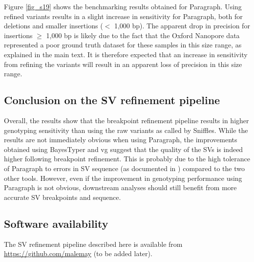 \documentclass[12pt]{article}
\begin{document}
Figure \ref{fig_s19} shows the benchmarking results obtained for Paragraph.
Using refined variants results in a slight increase in sensitivity for Paragraph, both for deletions and smaller insertions ($<$ 1,000 bp).
The apparent drop in precision for insertions $\geq$ 1,000 bp is likely due to the fact that the Oxford Nanopore data represented a poor ground truth dataset for these samples in this size range, as explained in the main text.
It is therefore expected that an increase in sensitivity from refining the variants will result in an apparent loss of precision in this size range.

\subsection{Conclusion on the SV refinement pipeline}

Overall, the results show that the breakpoint refinement pipeline results in higher genotyping sensitivity than using the raw variants as called by Sniffles.
While the results are not immediately obvious when using Paragraph, the improvements obtained using BayesTyper and vg suggest that the quality of the SVs is indeed higher following breakpoint refinement.
This is probably due to the high tolerance of Paragraph to errors in SV sequence (as documented in \cite{paragraph}) compared to the two other tools.
However, even if the improvement in genotyping performance using Paragraph is not obvious, downstream analyses should still benefit from more accurate SV breakpoints and sequence.

\subsection{Software availability}

The SV refinement pipeline described here is available from \textcolor{red}{\url{https://github.com/malemay}} (to be added later).

\clearpage
\end{document}
